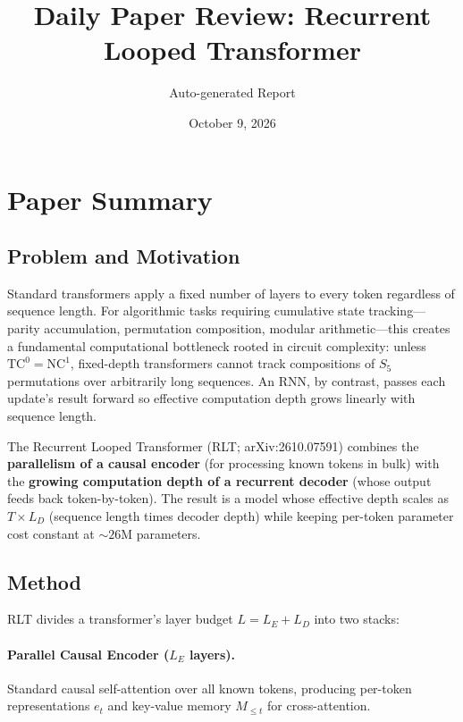 \documentclass[11pt,a4paper]{article}
\title{Daily Paper Review: Recurrent Looped Transformer}
\author{Auto-generated Report}
\date{October 9, 2026}
\begin{document}
\maketitle

\section{Paper Summary}

\subsection{Problem and Motivation}
Standard transformers apply a fixed number of layers to every token regardless of sequence length. For algorithmic tasks requiring cumulative state tracking---parity accumulation, permutation composition, modular arithmetic---this creates a fundamental computational bottleneck rooted in circuit complexity: unless $\text{TC}^0 = \text{NC}^1$, fixed-depth transformers cannot track compositions of $S_5$ permutations over arbitrarily long sequences. An RNN, by contrast, passes each update's result forward so effective computation depth grows linearly with sequence length.

The Recurrent Looped Transformer (RLT; arXiv:2610.07591) combines the \textbf{parallelism of a causal encoder} (for processing known tokens in bulk) with the \textbf{growing computation depth of a recurrent decoder} (whose output feeds back token-by-token). The result is a model whose effective depth scales as $T \times L_D$ (sequence length times decoder depth) while keeping per-token parameter cost constant at ${\sim}26$M parameters.

\subsection{Method}
RLT divides a transformer's layer budget $L = L_E + L_D$ into two stacks:

\paragraph{Parallel Causal Encoder ($L_E$ layers).} Standard causal self-attention over all known tokens, producing per-token representations $e_t$ and key-value memory $M_{\leq t}$ for cross-attention.
\end{document}
